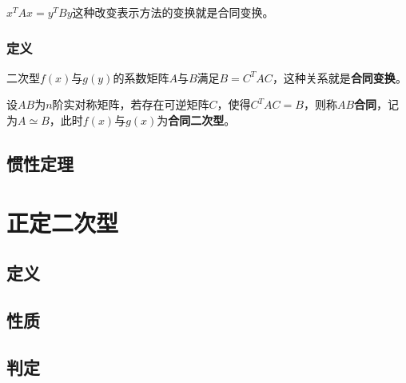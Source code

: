 \documentclass[UTF8, 12pt]{ctexart}
\begin{document}
$x^TAx=y^TBy$这种改变表示方法的变换就是合同变换。

\subsubsection{定义}

二次型$f(x)$与$g(y)$的系数矩阵$A$与$B$满足$B=C^TAC$，这种关系就是\textbf{合同变换}。

设$AB$为$n$阶实对称矩阵，若存在可逆矩阵$C$，使得$C^TAC=B$，则称$AB$\textbf{合同}，记为$A\simeq B$，此时$f(x)$与$g(x)$为\textbf{合同二次型}。

\subsection{惯性定理}

\section{正定二次型}

\subsection{定义}

\subsection{性质}

\subsection{判定}
\end{document}
